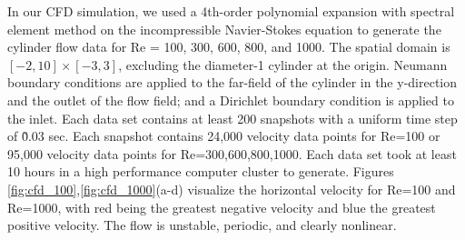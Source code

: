 In our CFD simulation, we used a 4th-order polynomial expansion with spectral element method on the incompressible Navier-Stokes equation to generate the cylinder flow data for Re = 100, 300, 600, 800, and 1000. The spatial domain is $\left[-2,10\right]\times\left[-3,3\right]$, excluding the diameter-1 cylinder at the origin.  Neumann boundary conditions are applied to the far-field of the cylinder in the y-direction and the outlet of the flow field; and a Dirichlet boundary condition is applied to the inlet. Each data set contains at least 200 snapshots with a uniform time step of \~0.03 sec. Each snapshot contains 24,000 velocity data points for Re=100 or 95,000 velocity data points for Re=300,600,800,1000. Each data set took at least 10 hours in a high performance computer cluster to generate. Figures \ref{fig:cfd_100},\ref{fig:cfd_1000}(a-d) visualize the horizontal velocity for Re=100 and Re=1000, with red being the greatest negative velocity and blue the greatest positive velocity. The flow is unstable, periodic, and clearly nonlinear.

\begin{figure*}[h] %
	\centering
	\\
	
	\caption{Visualization of Fluid Flow at Re = 100, CFD (a-d), E-GP (e-h)}
	\label{fig:cfd_100}
\end{figure*}

